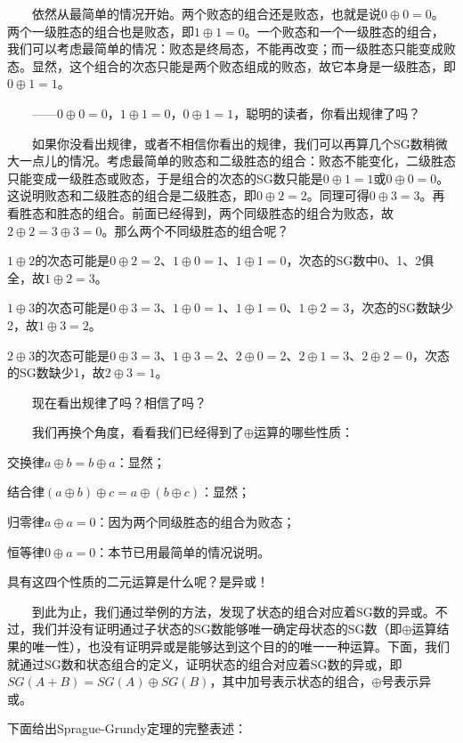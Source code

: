　　依然从最简单的情况开始。两个败态的组合还是败态，也就是说$0 \oplus 0 = 0$。两个一级胜态的组合也是败态，即$1 \oplus 1 = 0$。一个败态和一个一级胜态的组合，我们可以考虑最简单的情况：败态是终局态，不能再改变；而一级胜态只能变成败态。显然，这个组合的次态只能是两个败态组成的败态，故它本身是一级胜态，即$0 \oplus 1 = 1$。

　　——$0 \oplus 0 = 0$，$1 \oplus 1 = 0$，$0 \oplus 1 = 1$，聪明的读者，你看出规律了吗？

　　如果你没看出规律，或者不相信你看出的规律，我们可以再算几个SG数稍微大一点儿的情况。考虑最简单的败态和二级胜态的组合：败态不能变化，二级胜态只能变成一级胜态或败态，于是组合的次态的SG数只能是$0 \oplus 1 = 1$或$0 \oplus 0 = 0$。这说明败态和二级胜态的组合是二级胜态，即$0 \oplus 2 = 2$。同理可得$0 \oplus 3 = 3$。再看胜态和胜态的组合。前面已经得到，两个同级胜态的组合为败态，故$2 \oplus 2 = 3 \oplus 3 = 0$。那么两个不同级胜态的组合呢？

$1 \oplus 2$的次态可能是$0 \oplus 2 = 2$、$1 \oplus 0 = 1$、$1 \oplus 1 = 0$，次态的SG数中0、1、2俱全，故$1 \oplus 2 = 3$。

$1 \oplus 3$的次态可能是$0 \oplus 3 = 3$、$1 \oplus 0 = 1$、$1 \oplus 1 = 0$、$1 \oplus 2 = 3$，次态的SG数缺少2，故$1 \oplus 3 = 2$。

$2 \oplus 3$的次态可能是$0 \oplus 3 = 3$、$1 \oplus 3 = 2$、$2 \oplus 0 = 2$、$2 \oplus 1 = 3$、$2 \oplus 2 = 0$，次态的SG数缺少1，故$2 \oplus 3 = 1$。

　　现在看出规律了吗？相信了吗？

　　我们再换个角度，看看我们已经得到了$\oplus$运算的哪些性质：

交换律$a \oplus b = b \oplus a$：显然；

结合律$(a \oplus b) \oplus c = a \oplus (b \oplus c)$：显然；

归零律$a \oplus a = 0$：因为两个同级胜态的组合为败态；

恒等律$0 \oplus a = 0$：本节已用最简单的情况说明。

具有这四个性质的二元运算是什么呢？是异或！

　　到此为止，我们通过举例的方法，发现了状态的组合对应着SG数的异或。不过，我们并没有证明通过子状态的SG数能够唯一确定母状态的SG数（即$\oplus$运算结果的唯一性），也没有证明异或是能够达到这个目的的唯一一种运算。下面，我们就通过SG数和状态组合的定义，证明状态的组合对应着SG数的异或，即$SG(A+B)=SG(A) \oplus SG(B)$，其中加号表示状态的组合，$\oplus$号表示异或。


下面给出Sprague-Grundy定理的完整表述：

